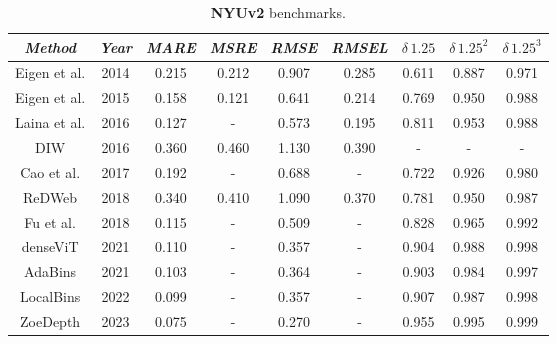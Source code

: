 \begin{table}
	\begin{adjustwidth}{-0.2\textwidth}{-0.2\textwidth}
	\centering
	\begin{tabular}{c|c|c|c|c|c|c|c|c}
	\emph{Method} & \emph{Year} & \emph{MARE} & \emph{MSRE} & \emph{RMSE} & \emph{RMSEL} & \emph{$\delta \, 1.25$} & \emph{$\delta \, 1.25^{2}$} & \emph{$\delta \, 1.25^{3}$} \\
	\hline
	Eigen et al. \cite{Eigen}                      & 2014 & 0.215 & 0.212 & 0.907 & 0.285 & 0.611 & 0.887 & 0.971 \\
	Eigen et al. \cite{Eigen2}                     & 2015 & 0.158 & 0.121 & 0.641 & 0.214 & 0.769 & 0.950 & 0.988 \\
	Laina et al. \cite{Laina}                      & 2016 & 0.127 &   -   & 0.573 & 0.195 & 0.811 & 0.953 & 0.988 \\
	DIW \cite{DIW}                                 & 2016 & 0.360 & 0.460 & 1.130 & 0.390 &   -   &   -   &   -   \\
	Cao et al.   \cite{depth_as_classification}    & 2017 & 0.192 &   -   & 0.688 &   -   & 0.722 & 0.926 & 0.980 \\
	ReDWeb \cite{ReDWeb}                           & 2018 & 0.340 & 0.410 & 1.090 & 0.370 & 0.781 & 0.950 & 0.987 \\
	Fu et al. \cite{ordinal_regression}            & 2018 & 0.115 &   -   & 0.509 &   -   & 0.828 & 0.965 & 0.992 \\
	denseViT \cite{denseViT}                       & 2021 & 0.110 &   -   & 0.357 &   -   & 0.904 & 0.988 & 0.998 \\
	AdaBins \cite{AdaBins}                         & 2021 & 0.103 &   -   & 0.364 &   -   & 0.903 & 0.984 & 0.997 \\
	LocalBins \cite{LocalBins}                     & 2022 & 0.099 &   -   & 0.357 &   -   & 0.907 & 0.987 & 0.998 \\
	ZoeDepth \cite{ZoeDepth}                       & 2023 & 0.075 &   -   & 0.270 &   -   & 0.955 & 0.995 & 0.999 \\
	\end{tabular}
\end{adjustwidth}
\caption[Frequently used metrics]{
	\textbf{NYUv2} benchmarks.
	\label{t:NYUv2_benchmarks}
}
\end{table}